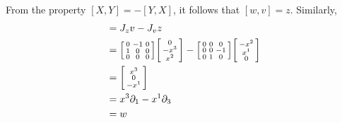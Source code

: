 \documentclass{article}
\begin{document}
 			From the property $[X,Y] = -[Y,X]$, it follows that $[w,v] = z$. Similarly,
 			\begin{align*}
 				[v,z] &= J_z v - J_v z \\
 				&= \begin{bsmallmatrix}
 					0	&	-1	&	0 \\
 					1	&	0	&	0 \\
 					0	&	0	&	0	
 				\end{bsmallmatrix}
 				\begin{bsmallmatrix}
 					0 \\-x^3 \\
 					x^2
 				\end{bsmallmatrix}
 				- \begin{bsmallmatrix}
 					0		&		0		&		0		\\
 					0		&	0		&	-1		\\
 					0		&	1	&	0
 				\end{bsmallmatrix} \begin{bsmallmatrix}
 					-x^2 \\x^1 \\ 0
 				\end{bsmallmatrix} \\
 				&= \begin{bsmallmatrix}
 					x^3 \\ 0 \\ -x^1
 				\end{bsmallmatrix}\\
 				&= x^3 \partial_1 - x^1 \partial_3  \\
 				&= w
 			\end{align*}
 		
\end{document}

